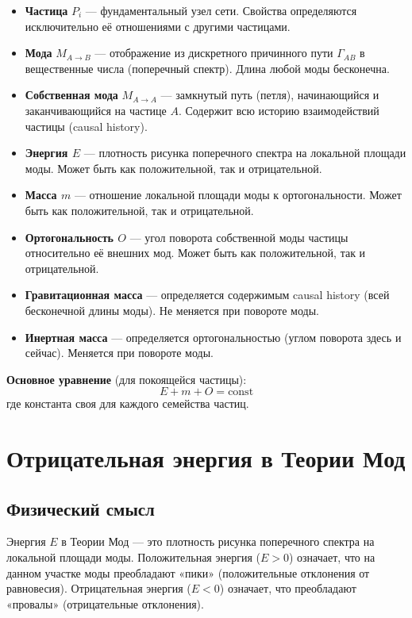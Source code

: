 \documentclass[12pt,a4paper]{article}
\begin{document}
\begin{itemize}
    \item \textbf{Частица} $P_i$ --- фундаментальный узел сети. Свойства определяются исключительно её отношениями с другими частицами.
    \item \textbf{Мода} $M_{A \to B}$ --- отображение из дискретного причинного пути $\Gamma_{AB}$ в вещественные числа (поперечный спектр). Длина любой моды бесконечна.
    \item \textbf{Собственная мода} $M_{A \to A}$ --- замкнутый путь (петля), начинающийся и заканчивающийся на частице $A$. Содержит всю историю взаимодействий частицы (causal history).
    \item \textbf{Энергия $E$} --- плотность рисунка поперечного спектра на локальной площади моды. Может быть как положительной, так и отрицательной.
    \item \textbf{Масса $m$} --- отношение локальной площади моды к ортогональности. Может быть как положительной, так и отрицательной.
    \item \textbf{Ортогональность $O$} --- угол поворота собственной моды частицы относительно её внешних мод. Может быть как положительной, так и отрицательной.
    \item \textbf{Гравитационная масса} --- определяется содержимым causal history (всей бесконечной длины моды). Не меняется при повороте моды.
    \item \textbf{Инертная масса} --- определяется ортогональностью (углом поворота здесь и сейчас). Меняется при повороте моды.
\end{itemize}

\textbf{Основное уравнение} (для покоящейся частицы):
\begin{equation}
    E + m + O = \text{const}
    \label{eq:sum}
\end{equation}
где константа своя для каждого семейства частиц.

\section{Отрицательная энергия в Теории Мод}

\subsection{Физический смысл}
Энергия $E$ в Теории Мод --- это плотность рисунка поперечного спектра на локальной площади моды. Положительная энергия ($E > 0$) означает, что на данном участке моды преобладают «пики» (положительные отклонения от равновесия). Отрицательная энергия ($E < 0$) означает, что преобладают «провалы» (отрицательные отклонения).
\end{document}
